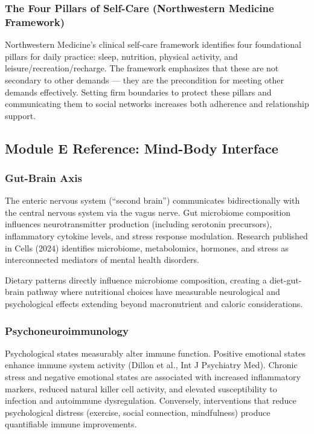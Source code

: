 \documentclass[11pt,letterpaper]{article}
\begin{document}
\subsubsection{The Four Pillars of Self-Care (Northwestern Medicine Framework)}

Northwestern Medicine's clinical self-care framework identifies four foundational pillars for daily practice: sleep, nutrition, physical activity, and leisure/recreation/recharge. The framework emphasizes that these are not secondary to other demands --- they are the precondition for meeting other demands effectively. Setting firm boundaries to protect these pillars and communicating them to social networks increases both adherence and relationship support.

\subsection{Module E Reference: Mind-Body Interface}

\subsubsection{Gut-Brain Axis}

The enteric nervous system (``second brain'') communicates bidirectionally with the central nervous system via the vagus nerve. Gut microbiome composition influences neurotransmitter production (including serotonin precursors), inflammatory cytokine levels, and stress response modulation. Research published in Cells (2024) identifies microbiome, metabolomics, hormones, and stress as interconnected mediators of mental health disorders.

Dietary patterns directly influence microbiome composition, creating a diet-gut-brain pathway where nutritional choices have measurable neurological and psychological effects extending beyond macronutrient and caloric considerations.

\subsubsection{Psychoneuroimmunology}

Psychological states measurably alter immune function. Positive emotional states enhance immune system activity (Dillon et al., Int J Psychiatry Med). Chronic stress and negative emotional states are associated with increased inflammatory markers, reduced natural killer cell activity, and elevated susceptibility to infection and autoimmune dysregulation. Conversely, interventions that reduce psychological distress (exercise, social connection, mindfulness) produce quantifiable immune improvements.
\end{document}
